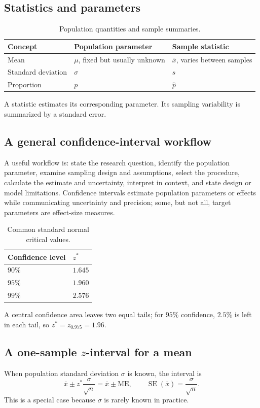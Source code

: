 \documentclass[11pt]{article}
\newcommand{\SE}{\operatorname{SE}}
\begin{document}
\subsection{Statistics and parameters}
\begin{table}[ht]
\centering
\caption{Population quantities and sample summaries.}
\begin{tabularx}{\textwidth}{@{}lYY@{}}
\toprule
Concept & Population parameter & Sample statistic \\
\midrule
Mean & $\mu$, fixed but usually unknown & $\bar{x}$, varies between samples \\
Standard deviation & $\sigma$ & $s$ \\
Proportion & $p$ & $\widehat p$ \\
\bottomrule
\end{tabularx}
\end{table}
A statistic estimates its corresponding parameter.  Its sampling variability
is summarized by a standard error.

\subsection{A general confidence-interval workflow}
A useful workflow is: state the research question, identify the population
parameter, examine sampling design and assumptions, select the procedure,
calculate the estimate and uncertainty, interpret in context, and state
design or model limitations.  Confidence intervals estimate population
parameters or effects while communicating uncertainty and precision; some,
but not all, target parameters are effect-size measures.

\begin{table}[ht]
\centering
\caption{Common standard normal critical values.}\label{tab:z-critical}
\begin{tabularx}{0.55\textwidth}{@{}lY@{}}
\toprule
Confidence level & $z^*$ \\
\midrule
$90\%$ & $1.645$ \\
$95\%$ & $1.960$ \\
$99\%$ & $2.576$ \\
\bottomrule
\end{tabularx}
\end{table}
A central confidence area leaves two equal tails; for $95\%$ confidence,
$2.5\%$ is left in each tail, so $z^*=z_{0.975}=1.96$.

\subsection{A one-sample \texorpdfstring{$z$}{z}-interval for a mean}
When population standard deviation $\sigma$ is known, the interval is
\begin{equation}\label{eq:zinterval}
\bar{x}\pm z^*\frac{\sigma}{\sqrt n}
=\bar{x}\pm \mathrm{ME},
\qquad \SE(\bar{x})=\frac{\sigma}{\sqrt n}.
\end{equation}
This is a special case because $\sigma$ is rarely known in practice.
\end{document}
